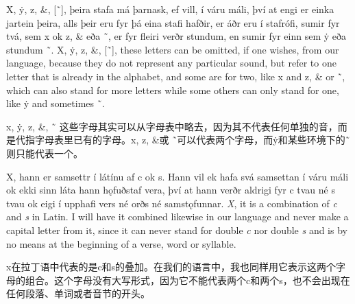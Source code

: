 \begin{paracol}{2}
  X, ẏ, z, \&, [˜], þeira stafa má þarnask, ef vill, í váru máli, því at engi er einka jartein þeira, alls þeir eru fyr þá eina stafi hafðir, er áðr eru í stafrófi, sumir fyr tvá, sem x ok z, \& eða ˜, er fyr fleiri verðr stundum, en sumir fyr einn sem ẏ eða stundum ˜.
  \switchcolumn
  X, ẏ, z, \&, [˜], these letters can be omitted, if one wishes, from our language, because they do not represent any particular sound, but refer to one letter that is already in the alphabet, and some are for two, like x and z, \& or ˜, which can also stand for more letters while some others can only stand for one, like ẏ and sometimes ˜.
\end{paracol}
\begin{translation*}{}
  x, ẏ, z, \&, ˜ 这些字母其实可以从字母表中略去，因为其不代表任何单独的音，而是代指字母表里已有的字母。x, z, \&或 ˜可以代表两个字母，而ẏ和某些环境下的˜则只能代表一个。
\end{translation*}
\begin{paracol}{2}
  X, hann er samsettr í látínu af c ok s. Hann vil ek hafa svá samsettan í váru máli ok ekki sinn láta hann hǫfuðstaf vera, því at hann verðr aldrigi fyr c tvau né s tvau ok eigi í upphafi vers né orðs né samstǫfunnar.
  \switchcolumn
  \textit{X}, it is a combination of \textit{c} and \textit{s} in Latin. I will have it combined likewise in our language and never make a capital letter from it, since it can never stand for double \textit{c} nor double \textit{s} and is by no means at the beginning of a verse, word or syllable.
\end{paracol}
\begin{translation*}{}
  x在拉丁语中代表的是c和s的叠加。在我们的语言中，我也同样用它表示这两个字母的组合。这个字母没有大写形式，因为它不能代表两个c和两个s，也不会出现在任何段落、单词或者音节的开头。
\end{translation*}

